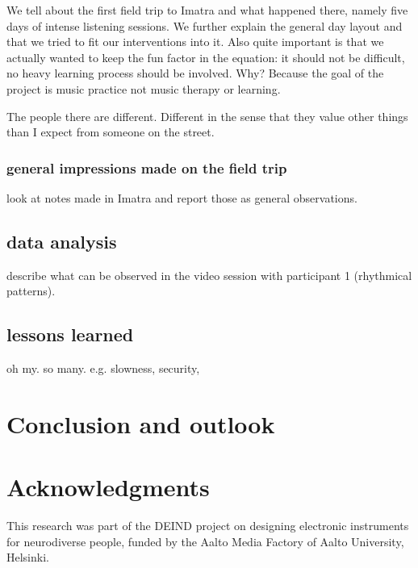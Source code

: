 \documentclass{chi-ext}
\begin{document}
\begin{multicols}{2}
We tell about the first field trip to Imatra and what happened there, namely five days of intense listening sessions.
We further explain the general day layout and that we tried to fit our interventions into it.
Also quite important is that we actually wanted to keep the fun factor in the equation: it should not be difficult, no heavy learning process should be involved. Why? Because the goal of the project is music practice not music therapy or learning.

The people there are different. Different in the sense that they value other things than I expect from someone on the street.




\subsubsection{general impressions made on the field trip}
\label{ssub:general_impressions_made_on_the_field_trip}

look at notes made in Imatra and report those as general observations.


\subsection{data analysis}
\label{sub:data_analysis}

describe what can be observed in the video session with participant 1 (rhythmical patterns).




\subsection{lessons learned}
\label{sub:lessons_learned}

oh my. so many.
e.g. 
slowness,
security,







\section{Conclusion and outlook}
\label{sec:conclusion_and_outlook}




\section{Acknowledgments}
This research was part of the DEIND project on designing electronic instruments for neurodiverse people, funded by the Aalto Media Factory of Aalto University, Helsinki.  



\end{multicols}
\end{document}
